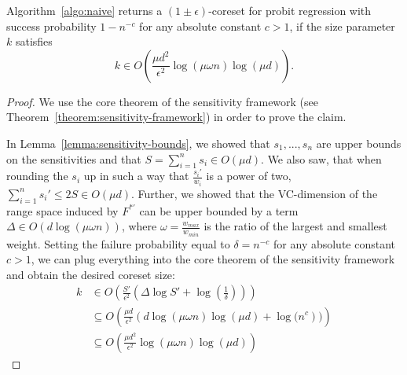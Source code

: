\begin{theorem}
    Algorithm~\ref{algo:naive} returns a $(1 \pm \epsilon)$-coreset
    for probit regression with success probability
    $1 - n^{-c}$ for any absolute constant
    $c > 1$, if the size parameter $k$ satisfies
    \begin{equation*}
        k \in O\left(\frac{\mu d^2}{\epsilon^2} \log(\mu \omega n) \log(\mu d)\right).
    \end{equation*}
\end{theorem}
\begin{proof}
    We use the core theorem of the sensitivity framework
    (see Theorem~\ref{theorem:sensitivity-framework}) in order
    to prove the claim.

    In Lemma~\ref{lemma:sensitivity-bounds},
    we showed that $s_1, ..., s_n$
    are upper bounds on the sensitivities and that
    $S = \sum_{i=1}^n s_i \in O(\mu d)$.
    We also saw, that when rounding the $s_i$ up in such a way that
    $\frac{s_i'}{w_i}$ is a power of two,
    $\sum_{i=1}^n s_i' \leq 2S \in O(\mu d)$.
    Further, we showed that the VC-dimension of the range space
    induced by $F^{\ast '}$ can be upper bounded by
    a term $\Delta \in O(d\log(\mu \omega n))$, where
    $\omega = \frac{w_{max}}{w_{min}}$ is the ratio of the
    largest and smallest weight.
    Setting the failure probability equal to $\delta = n^{-c}$
    for any absolute constant $c > 1$, we can plug everything
    into the core theorem of the sensitivity framework and
    obtain the desired coreset size:
    \begin{align*}
        k & \in O\left( \frac{S'}{\epsilon^2} \left(\Delta \log S' + \log\left(\frac{1}{\delta}\right)\right)\right)  \\
          & \subseteq O\left(\frac{\mu d}{\epsilon^2}\left(d \log(\mu \omega n) \log(\mu d) + \log(n^c\right))\right) \\
          & \subseteq O\left(\frac{\mu d^2}{\epsilon^2}\log(\mu \omega n) \log(\mu d)\right)
    \end{align*}
\end{proof}
